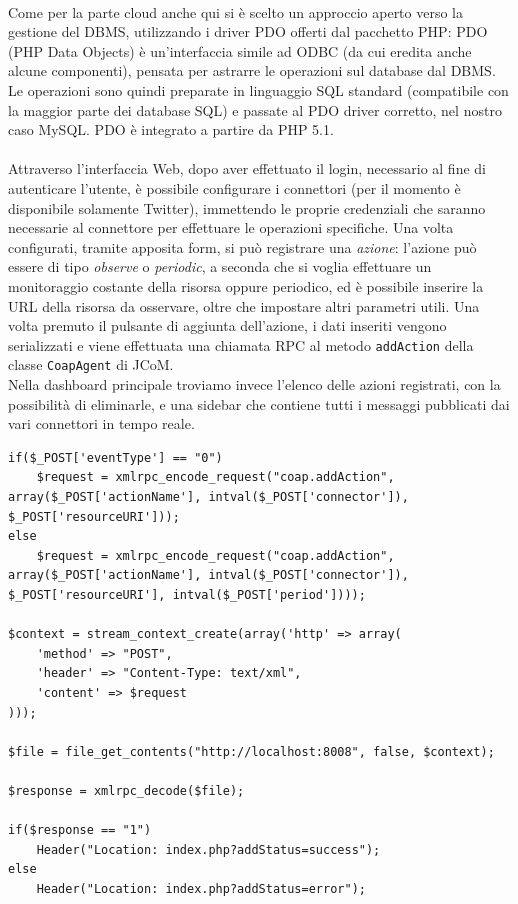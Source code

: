 \\Come per la parte cloud anche qui si è scelto un approccio aperto verso la gestione del DBMS, utilizzando i driver PDO offerti dal pacchetto PHP: PDO (PHP Data Objects) è un'interfaccia simile ad ODBC (da cui eredita anche alcune componenti), pensata per astrarre le operazioni sul database dal DBMS. Le operazioni sono quindi preparate in linguaggio SQL standard (compatibile con la maggior parte dei database SQL) e passate al PDO driver corretto, nel nostro caso MySQL. PDO è integrato a partire da PHP 5.1.
\\\\Attraverso l'interfaccia Web, dopo aver effettuato il login, necessario al fine di autenticare l'utente, è possibile configurare i connettori (per il momento è disponibile solamente Twitter), immettendo le proprie credenziali che saranno necessarie al connettore per effettuare le operazioni specifiche. Una volta configurati, tramite apposita form, si può registrare una \textit{azione}: l'azione può essere di tipo \textit{observe} o \textit{periodic}, a seconda che si voglia effettuare un monitoraggio costante della risorsa oppure periodico, ed è possibile inserire la URL della risorsa da osservare, oltre che impostare altri parametri utili. Una volta premuto il pulsante di aggiunta dell'azione, i dati inseriti vengono serializzati e viene effettuata una chiamata RPC al metodo {\tt addAction} della classe {\tt CoapAgent} di JCoM.
\\Nella dashboard principale troviamo invece l'elenco delle azioni registrati, con la possibilità di eliminarle, e una sidebar che contiene tutti i messaggi pubblicati dai vari connettori in tempo reale.

\lstset{title=Il codice PHP che serializza la chiamata RPC su XML e la deserializza per leggere il valore di ritorno, language=PHP}
\begin{lstlisting}[float]
if($_POST['eventType'] == "0")
	$request = xmlrpc_encode_request("coap.addAction", array($_POST['actionName'], intval($_POST['connector']), $_POST['resourceURI']));
else
	$request = xmlrpc_encode_request("coap.addAction", array($_POST['actionName'], intval($_POST['connector']), $_POST['resourceURI'], intval($_POST['period'])));
	
$context = stream_context_create(array('http' => array(
    'method' => "POST",
    'header' => "Content-Type: text/xml",
    'content' => $request
)));

$file = file_get_contents("http://localhost:8008", false, $context);

$response = xmlrpc_decode($file);

if($response == "1")
	Header("Location: index.php?addStatus=success");
else
	Header("Location: index.php?addStatus=error");
\end{lstlisting}


